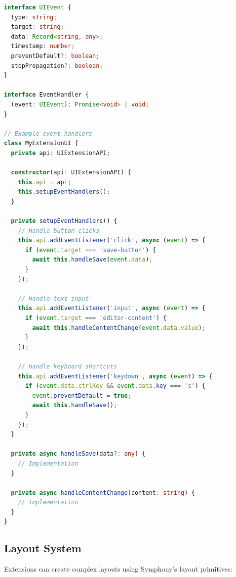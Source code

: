 \begin{lstlisting}[language=TypeScript,caption={Event Handling System}]
interface UIEvent {
  type: string;
  target: string;
  data: Record<string, any>;
  timestamp: number;
  preventDefault?: boolean;
  stopPropagation?: boolean;
}

interface EventHandler {
  (event: UIEvent): Promise<void> | void;
}

// Example event handlers
class MyExtensionUI {
  private api: UIExtensionAPI;
  
  constructor(api: UIExtensionAPI) {
    this.api = api;
    this.setupEventHandlers();
  }
  
  private setupEventHandlers() {
    // Handle button clicks
    this.api.addEventListener('click', async (event) => {
      if (event.target === 'save-button') {
        await this.handleSave(event.data);
      }
    });
    
    // Handle text input
    this.api.addEventListener('input', async (event) => {
      if (event.target === 'editor-content') {
        await this.handleContentChange(event.data.value);
      }
    });
    
    // Handle keyboard shortcuts
    this.api.addEventListener('keydown', async (event) => {
      if (event.data.ctrlKey && event.data.key === 's') {
        event.preventDefault = true;
        await this.handleSave();
      }
    });
  }
  
  private async handleSave(data?: any) {
    // Implementation
  }
  
  private async handleContentChange(content: string) {
    // Implementation
  }
}
\end{lstlisting}

\subsection*{Layout System}

Extensions can create complex layouts using Symphony's layout primitives:

